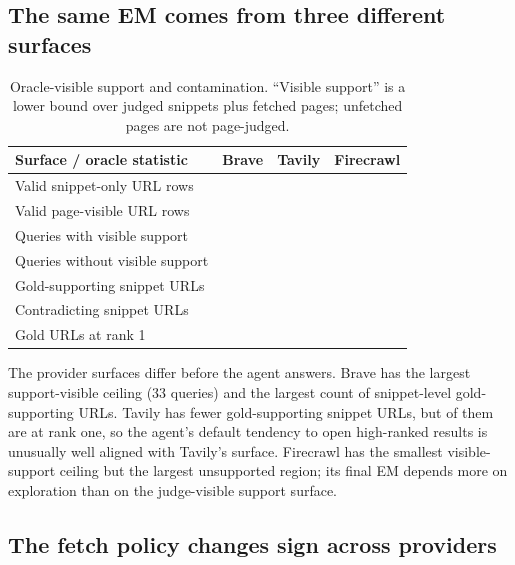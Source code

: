 \documentclass[11pt]{article}
\begin{document}
\subsection{The same EM comes from three different surfaces}

\begin{table}[t]
\centering
\small
\begin{tabular}{lrrr}
\toprule
\textbf{Surface / oracle statistic} & \textbf{Brave} & \textbf{Tavily} & \textbf{Firecrawl} \\
\midrule
Valid snippet-only URL rows & \BraveSnippetRows{} & \TavilySnippetRows{} & \FirecrawlSnippetRows{} \\
Valid page-visible URL rows & \BravePageRows{} & \TavilyPageRows{} & \FirecrawlPageRows{} \\
Queries with visible support & \BraveSupportVisibleQ{} & \TavilySupportVisibleQ{} & \FirecrawlSupportVisibleQ{} \\
Queries without visible support & \BraveNoSupportQ{} & \TavilyNoSupportQ{} & \FirecrawlNoSupportQ{} \\
Gold-supporting snippet URLs & \BraveGoldURLs{} & \TavilyGoldURLs{} & \FirecrawlGoldURLs{} \\
Contradicting snippet URLs & \BraveContraURLs{} & \TavilyContraURLs{} & \FirecrawlContraURLs{} \\
Gold URLs at rank 1 & \BraveRankOnePct{} & \textbf{\TavilyRankOnePct{}} & \FirecrawlRankOnePct{} \\
\bottomrule
\end{tabular}
\caption{Oracle-visible support and contamination. ``Visible support'' is a lower bound over judged snippets plus fetched pages; unfetched pages are not page-judged.}
\label{tab:surface}
\end{table}

The provider surfaces differ before the agent answers. Brave has the largest support-visible ceiling (33 queries) and the largest count of snippet-level gold-supporting URLs. Tavily has fewer gold-supporting snippet URLs, but \TavilyRankOneGold{} of them are at rank one, so the agent's default tendency to open high-ranked results is unusually well aligned with Tavily's surface. Firecrawl has the smallest visible-support ceiling but the largest unsupported region; its final EM depends more on exploration than on the judge-visible support surface.

\subsection{The fetch policy changes sign across providers}
\end{document}
